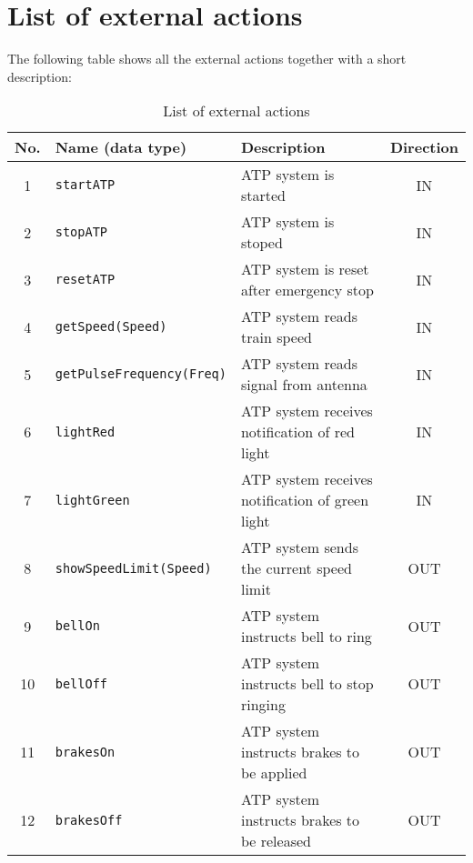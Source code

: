 \documentclass[11pt,a4paper]{article}
\newcommand{\stopATP}{\texttt{stopATP} }
\newcommand{\startATP}{\texttt{startATP} }
\newcommand{\resetATP}{\texttt{resetATP} }
\newcommand{\getSpeed}[1]{\texttt{getSpeed(#1)} }
\newcommand{\getPulseFrequency}[1]{\texttt{getPulseFrequency(#1)} }
\newcommand{\lightRed}{\texttt{lightRed} }
\newcommand{\lightGreen}{\texttt{lightGreen} }
\newcommand{\showSpeedLimit}[1]{\texttt{showSpeedLimit(#1)} }
\newcommand{\bellOn}{\texttt{bellOn} }
\newcommand{\bellOff}{\texttt{bellOff} }
\newcommand{\brakesOn}{\texttt{brakesOn} }
\newcommand{\brakesOff}{\texttt{brakesOff} }
\begin{document}
 








\newpage


\section{List of external actions}

The following table shows all the external actions together with a short description:\\

\begin{table}[!hbp]
	\centering
	\begin{adjustwidth}{-1.5cm}{}
	\begin{tabular}{|c|l|l|c|}
		
		\hline
		\textbf{No.} & \textbf{Name (data type)}&\textbf{Description} & \textbf{Direction} \\
		\hline
		1 & \startATP & ATP system is started & IN \\
		\hline
    	2 & \stopATP & ATP system is stoped & IN \\
	    \hline
		3 & \resetATP & ATP system is reset after emergency stop & IN \\
		\hline
	    4 & \getSpeed{Speed} & ATP system reads train speed & IN \\
		\hline
		5 & \getPulseFrequency{Freq} & ATP system reads signal from antenna & IN \\
		\hline
		6 & \lightRed & ATP system receives notification of red light & IN \\
		\hline
		7 & \lightGreen & ATP system receives notification of green light & IN \\
		\hline
		8 & \showSpeedLimit{Speed} & ATP system sends the current speed limit & OUT \\
		\hline
		9 & \bellOn & ATP system instructs bell to ring & OUT \\
		\hline
		10 & \bellOff & ATP system instructs bell to stop ringing & OUT \\
		\hline
		11 & \brakesOn & ATP system instructs brakes to be applied & OUT \\
		\hline	
		12 & \brakesOff & ATP system instructs brakes to be released & OUT \\
		\hline
				\end{tabular}
				\end{adjustwidth}
	\caption{List of external actions}
\end{table}
\end{document}
